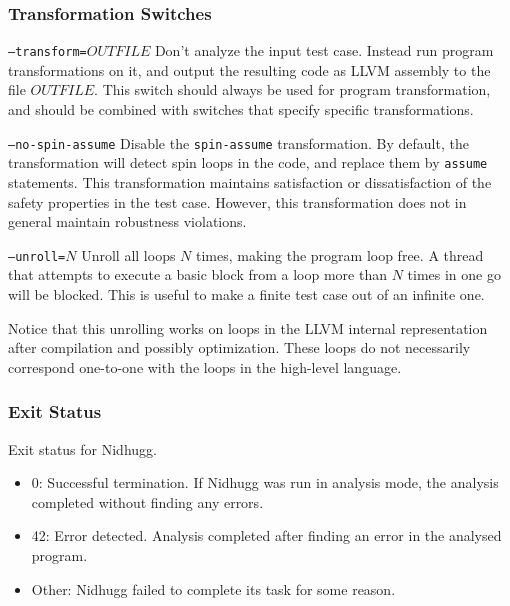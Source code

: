 \documentclass[a4paper]{article}
\begin{document}
\subsubsection{Transformation Switches}\label{sec:transform:switches}

\begin{description}
\item{\texttt{--transform=$OUTFILE$}}
%
  Don't analyze the input test case. Instead run program
  transformations on it, and output the resulting code as LLVM
  assembly to the file $OUTFILE$. This switch should always be used
  for program transformation, and should be combined with switches
  that specify specific transformations.
\item{\texttt{--no-spin-assume}}
%
  Disable the \texttt{spin-assume} transformation. By default, the
  transformation will detect spin loops in the code, and replace them
  by \texttt{assume} statements. This transformation maintains
  satisfaction or dissatisfaction of the safety properties in the test
  case. However, this transformation does not in general maintain
  robustness violations.
\item{\texttt{--unroll=$N$}}
%
  Unroll all loops $N$ times, making the program loop free. A thread
  that attempts to execute a basic block from a loop more than $N$
  times in one go will be blocked. This is useful to make a finite
  test case out of an infinite one.

  Notice that this unrolling works on loops in the LLVM internal
  representation after compilation and possibly optimization. These
  loops do not necessarily correspond one-to-one with the loops in the
  high-level language.
\end{description}

\subsubsection{Exit Status}

Exit status for Nidhugg.

\begin{itemize}
\item 0: Successful termination. If Nidhugg was run in analysis mode,
  the analysis completed without finding any errors.
\item 42: Error detected. Analysis completed after finding an error in the analysed program.
\item Other: Nidhugg failed to complete its task for some reason.
\end{itemize}
\end{document}

